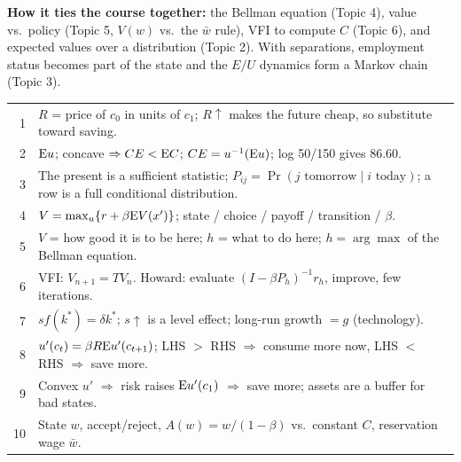 \documentclass[10pt]{article}
\begin{document}
\textbf{How it ties the course together:} the Bellman equation (Topic 4), value vs.\ policy (Topic 5, $V(w)$ vs.\ the $\bar w$ rule), VFI to compute $C$ (Topic 6), and expected values over a distribution (Topic 2). With separations, employment status becomes part of the state and the $E/U$ dynamics form a Markov chain (Topic 3).

\vspace{6pt}
\begin{tcolorbox}[colback=soft,colframe=ink,boxrule=0.6pt,arc=2pt,title={\bfseries One-line recall for each topic},fonttitle=\small]
\small
\begin{tabular}{@{}r@{\;}p{}@{}}
1 & $R$ = price of $c_0$ in units of $c_1$; $R\uparrow$ makes the future cheap, so substitute toward saving.\\
2 & $\mathrm{E} u$; concave $\Rightarrow CE<\mathrm{E} C$; $CE=u^{-1}(\mathrm{E} u)$; log 50/150 gives 86.60.\\
3 & The present is a sufficient statistic; $P_{ij}=\Pr(j\text{ tomorrow}\mid i\text{ today})$; a row is a full conditional distribution.\\
4 & $V=\max_u\{r+\beta\mathrm{E} V(x')\}$; state / choice / payoff / transition / $\beta$.\\
5 & $V$ = how good it is to be here; $h$ = what to do here; $h=\arg\max$ of the Bellman equation.\\
6 & VFI: $V_{n+1}=TV_n$. Howard: evaluate $(I-\beta P_h)^{-1}r_h$, improve, few iterations.\\
7 & $sf(k^*)=\delta k^*$; $s\uparrow$ is a level effect; long-run growth $=g$ (technology).\\
8 & $u'(c_t)=\beta R\mathrm{E} u'(c_{t+1})$; LHS $>$ RHS $\Rightarrow$ consume more now, LHS $<$ RHS $\Rightarrow$ save more.\\
9 & Convex $u'$ $\Rightarrow$ risk raises $\mathrm{E} u'(c_1)$ $\Rightarrow$ save more; assets are a buffer for bad states.\\
10 & State $w$, accept/reject, $A(w)=w/(1-\beta)$ vs.\ constant $C$, reservation wage $\bar w$.
\end{tabular}
\end{tcolorbox}
\end{document}
